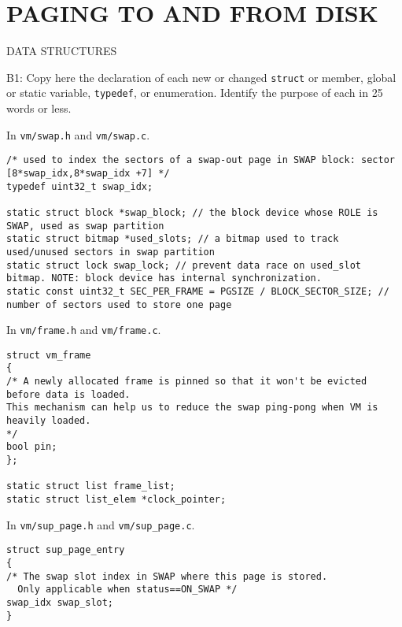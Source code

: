 \section*{PAGING TO AND FROM DISK}

\begin{aspect}{DATA STRUCTURES}

	\begin{qc}
		B1: Copy here the declaration of each new or changed \lstinline{struct} or member,
		global or static variable, \lstinline{typedef}, or enumeration.
		Identify the purpose of each in 25 words or less.
	\end{qc}


	In \lstinline{vm/swap.h} and \lstinline{vm/swap.c}.
	\begin{lstlisting}
/* used to index the sectors of a swap-out page in SWAP block: sector [8*swap_idx,8*swap_idx +7] */
typedef uint32_t swap_idx;

static struct block *swap_block; // the block device whose ROLE is SWAP, used as swap partition
static struct bitmap *used_slots; // a bitmap used to track used/unused sectors in swap partition
static struct lock swap_lock; // prevent data race on used_slot bitmap. NOTE: block device has internal synchronization.
static const uint32_t SEC_PER_FRAME = PGSIZE / BLOCK_SECTOR_SIZE; // number of sectors used to store one page
\end{lstlisting}

In \lstinline{vm/frame.h} and \lstinline{vm/frame.c}.
	\begin{lstlisting}
struct vm_frame
{
/* A newly allocated frame is pinned so that it won't be evicted before data is loaded.
This mechanism can help us to reduce the swap ping-pong when VM is heavily loaded.
*/
bool pin;
};

static struct list frame_list;
static struct list_elem *clock_pointer;
\end{lstlisting}

In \lstinline{vm/sup_page.h} and \lstinline{vm/sup_page.c}.
	\begin{lstlisting}
struct sup_page_entry
{
/* The swap slot index in SWAP where this page is stored.
  Only applicable when status==ON_SWAP */
swap_idx swap_slot;
}
	\end{lstlisting}
\end{aspect}


